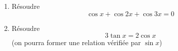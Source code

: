 \begin{enumerate}
\item Résoudre
\[\cos x +\cos 2x +\cos 3x =0\]
\item Résoudre
\[3 \tan x =2 \cos x\]
(on pourra former une relation vérifiée par $\sin x$)
\end{enumerate}